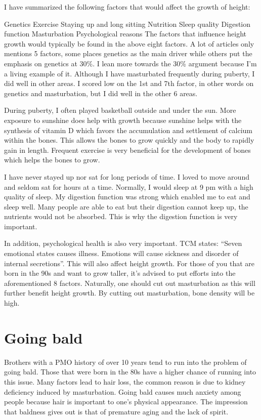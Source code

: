 \documentclass[
]{book}
\begin{document}
I have summarized the following factors that would affect the growth of height:

Genetics
Exercise
Staying up and long sitting
Nutrition
Sleep quality
Digestion function
Masturbation
Psychological reasons
The factors that influence height growth would typically be found in the above eight factors. A lot of articles only mentions 5 factors, some places genetics as the main driver while others put the emphasis on genetics at 30\%. I lean more towards the 30\% argument because I'm a living example of it. Although I have masturbated frequently during puberty, I did well in other areas. I scored low on the 1st and 7th factor, in other words on genetics and masturbation, but I did well in the other 6 areas.

During puberty, I often played basketball outside and under the sun. More exposure to sunshine does help with growth because sunshine helps with the synthesis of vitamin D which favors the accumulation and settlement of calcium within the bones. This allows the bones to grow quickly and the body to rapidly gain in length. Frequent exercise is very beneficial for the development of bones which helps the bones to grow.

I have never stayed up nor sat for long periods of time. I loved to move around and seldom sat for hours at a time. Normally, I would sleep at 9 pm with a high quality of sleep. My digestion function was strong which enabled me to eat and sleep well. Many people are able to eat but their digestion cannot keep up, the nutrients would not be absorbed. This is why the digestion function is very important.

In addition, psychological health is also very important. TCM states: ``Seven emotional states causes illness. Emotions will cause sickness and disorder of internal secretions''. This will also affect height growth. For those of you that are born in the 90s and want to grow taller, it's advised to put efforts into the aforementioned 8 factors. Naturally, one should cut out masturbation as this will further benefit height growth. By cutting out masturbation, bone density will be high.

\hypertarget{going-bald}{%
\section{Going bald}\label{going-bald}}

Brothers with a PMO history of over 10 years tend to run into the problem of going bald. Those that were born in the 80s have a higher chance of running into this issue. Many factors lead to hair loss, the common reason is due to kidney deficiency induced by masturbation. Going bald causes much anxiety among people because hair is important to one's physical appearance. The impression that baldness gives out is that of premature aging and the lack of spirit.
\end{document}

